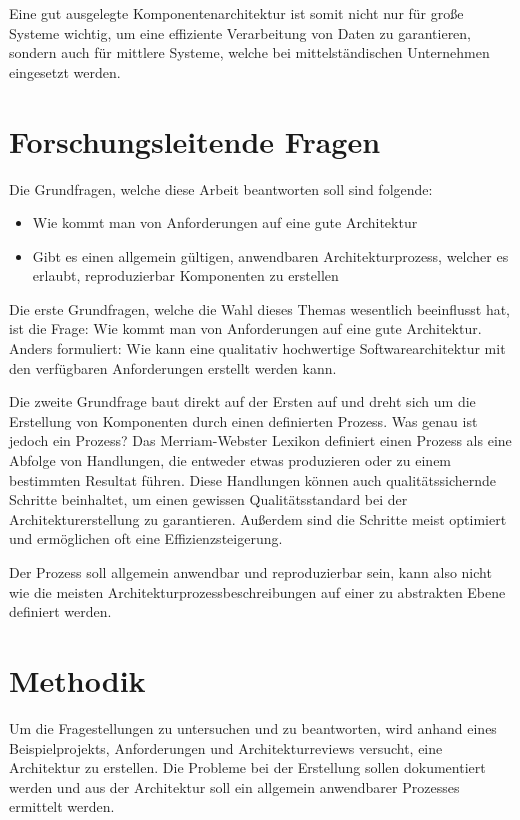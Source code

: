 Eine gut ausgelegte Komponentenarchitektur ist somit nicht nur für große Systeme wichtig, um eine effiziente Verarbeitung von Daten zu garantieren, sondern auch für mittlere Systeme, welche bei mittelständischen Unternehmen eingesetzt werden.

\section{Forschungsleitende Fragen}
Die Grundfragen, welche diese Arbeit beantworten soll sind folgende:

\begin{itemize}
  \item Wie kommt man von Anforderungen auf eine gute Architektur
  \item Gibt es einen allgemein gültigen, anwendbaren Architekturprozess, welcher es erlaubt, reproduzierbar Komponenten zu erstellen
\end{itemize}

Die erste Grundfragen, welche die Wahl dieses Themas wesentlich beeinflusst hat, ist die Frage: Wie kommt man von Anforderungen auf eine gute Architektur. Anders formuliert: Wie kann eine qualitativ hochwertige Softwarearchitektur mit den verfügbaren Anforderungen erstellt werden kann.

Die zweite Grundfrage baut direkt auf der Ersten auf und dreht sich um die Erstellung von Komponenten durch einen definierten Prozess. Was genau ist jedoch ein Prozess? Das Merriam-Webster Lexikon definiert einen Prozess als eine Abfolge von Handlungen, die entweder etwas produzieren oder zu einem bestimmten Resultat führen\cite{processweb}. Diese Handlungen können auch qualitätssichernde Schritte beinhaltet, um einen gewissen Qualitätsstandard bei der Architekturerstellung zu garantieren. Außerdem sind die Schritte meist optimiert und ermöglichen oft eine Effizienzsteigerung.

Der Prozess soll allgemein anwendbar und reproduzierbar sein, kann also nicht wie die meisten Architekturprozessbeschreibungen auf einer zu abstrakten Ebene definiert werden.

\section{Methodik}
Um die Fragestellungen zu untersuchen und  zu beantworten, wird anhand eines  Beispielprojekts, Anforderungen und Architekturreviews versucht, eine Architektur zu erstellen. Die Probleme bei der Erstellung sollen dokumentiert werden und aus der Architektur soll ein allgemein anwendbarer Prozesses ermittelt werden.

